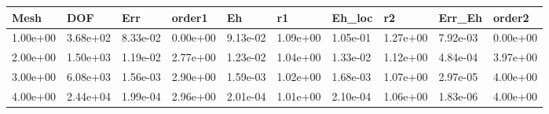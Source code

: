 \begin{tabular}{llllllllll}
Mesh & DOF & Err & order1 & Eh & r1 & Eh_loc & r2 & Err_Eh & order2 \\ 
\hline 
1.00e+00 & 3.68e+02 & 8.33e-02 & 0.00e+00 & 9.13e-02 & 1.09e+00 & 1.05e-01 & 1.27e+00 & 7.92e-03 & 0.00e+00 \\ 
2.00e+00 & 1.50e+03 & 1.19e-02 & 2.77e+00 & 1.23e-02 & 1.04e+00 & 1.33e-02 & 1.12e+00 & 4.84e-04 & 3.97e+00 \\ 
3.00e+00 & 6.08e+03 & 1.56e-03 & 2.90e+00 & 1.59e-03 & 1.02e+00 & 1.68e-03 & 1.07e+00 & 2.97e-05 & 4.00e+00 \\ 
4.00e+00 & 2.44e+04 & 1.99e-04 & 2.96e+00 & 2.01e-04 & 1.01e+00 & 2.10e-04 & 1.06e+00 & 1.83e-06 & 4.00e+00 \\ 
\hline 
\end{tabular}